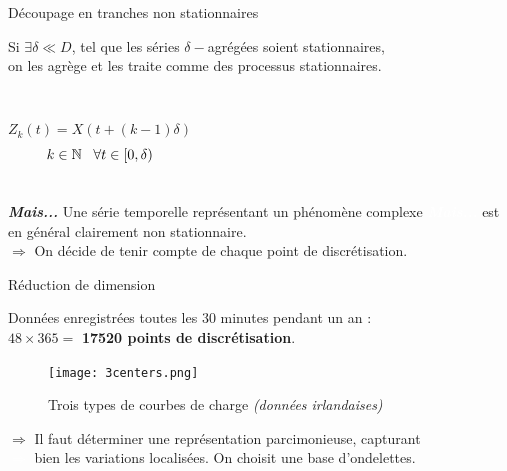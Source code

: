 \begin{frame}{Découpage en tranches non stationnaires}

Si $\exists \delta \ll D$, tel que les séries $\delta-$agrégées soient stationnaires,\\
on les agrège et les traite comme des processus stationnaires.\\[0.3cm]

\begin{columns}
  \column{6cm}    
    
   ~
  \column{5cm}
	\vspace*{-1cm}
     \[ Z_k(t) = X(t + (k-1)\delta)             \]
     \[  k\in\mathbb{N} \;\;\; \forall t \in [0,\delta) \]
\end{columns}

\textbf{\emph{Mais...}} 
Une série temporelle représentant un phénomène complexe 
\textcolor{white}{\textbf{\emph{Mais...}} }est en général clairement non stationnaire.\\[0.5cm]

$\Rightarrow$ On décide de tenir compte de chaque point de discrétisation.




\end{frame}

\begin{frame}{Réduction de dimension}

Données enregistrées toutes les 30 minutes pendant un an :\\
$48 \times 365 =$ \textbf{17520 points de discrétisation}.\\[0.3cm]

\vspace*{-0.4cm}
\begin{figure}[!ht]
\centering
\texttt{[image: 3centers.png]}
\vspace*{-0.35cm}
\caption{Trois types de courbes de charge \emph{(données irlandaises)}}%
\end{figure}

\vspace*{-0.3cm}
$\Rightarrow$ Il faut déterminer une représentation parcimonieuse, capturant\\
\textcolor{white}{$\Rightarrow$ }bien les variations localisées. On choisit une base d'ondelettes.\\[0.5cm]

\end{frame}

